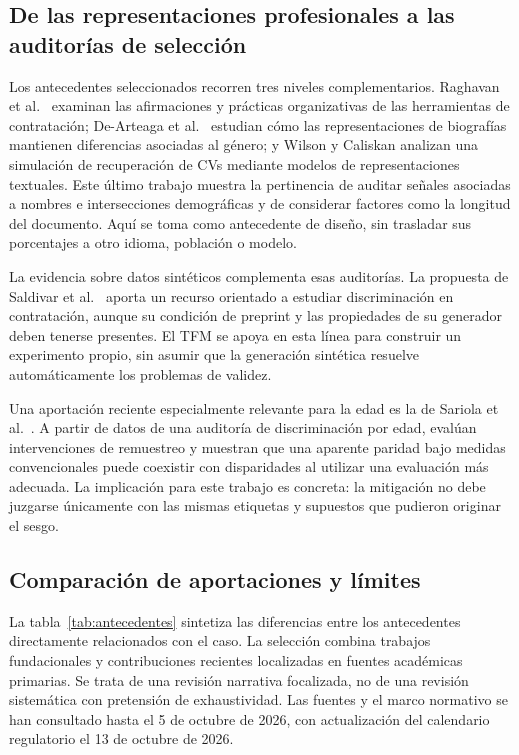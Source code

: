 \documentclass[11pt,a4paper,oneside]{report}
\begin{document}
\subsection{De las representaciones profesionales a las auditorías de selección}

Los antecedentes seleccionados recorren tres niveles complementarios. Raghavan et al.\ \cite{raghavan2020} examinan las afirmaciones y prácticas organizativas de las herramientas de contratación; De-Arteaga et al.\ \cite{dearteaga2019} estudian cómo las representaciones de biografías mantienen diferencias asociadas al género; y Wilson y Caliskan \cite{wilson2024} analizan una simulación de recuperación de CVs mediante modelos de representaciones textuales. Este último trabajo muestra la pertinencia de auditar señales asociadas a nombres e intersecciones demográficas y de considerar factores como la longitud del documento. Aquí se toma como antecedente de diseño, sin trasladar sus porcentajes a otro idioma, población o modelo.

La evidencia sobre datos sintéticos complementa esas auditorías. La propuesta de Saldivar et al.\ \cite{saldivar2025} aporta un recurso orientado a estudiar discriminación en contratación, aunque su condición de preprint y las propiedades de su generador deben tenerse presentes. El TFM se apoya en esta línea para construir un experimento propio, sin asumir que la generación sintética resuelve automáticamente los problemas de validez.

Una aportación reciente especialmente relevante para la edad es la de Sariola et al.\ \cite{sariola2026}. A partir de datos de una auditoría de discriminación por edad, evalúan intervenciones de remuestreo y muestran que una aparente paridad bajo medidas convencionales puede coexistir con disparidades al utilizar una evaluación más adecuada. La implicación para este trabajo es concreta: la mitigación no debe juzgarse únicamente con las mismas etiquetas y supuestos que pudieron originar el sesgo.

\subsection{Comparación de aportaciones y límites}

La tabla~\ref{tab:antecedentes} sintetiza las diferencias entre los antecedentes directamente relacionados con el caso. La selección combina trabajos fundacionales y contribuciones recientes localizadas en fuentes académicas primarias. Se trata de una revisión narrativa focalizada, no de una revisión sistemática con pretensión de exhaustividad. Las fuentes y el marco normativo se han consultado hasta el 5 de octubre de 2026, con actualización del calendario regulatorio el 13 de octubre de 2026.
\end{document}
